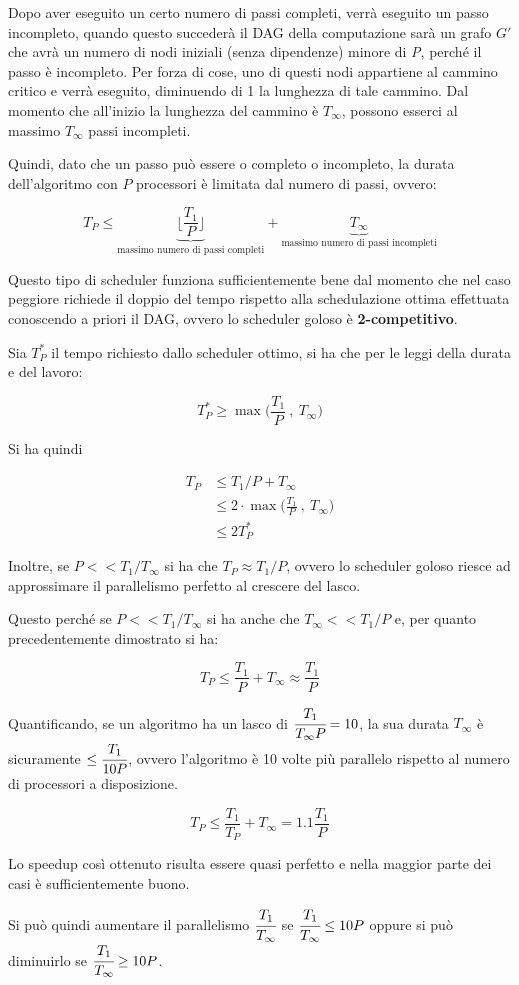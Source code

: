 Dopo aver eseguito un certo numero di passi completi, verrà eseguito un passo incompleto, quando questo succederà il DAG della computazione sarà un grafo $G'$ che avrà un numero di nodi iniziali (senza dipendenze) minore di \emph{P}, perché il passo è incompleto. 
Per forza di cose, uno di questi nodi appartiene al cammino critico e verrà eseguito, diminuendo di 1 la lunghezza di tale cammino. 
Dal momento che all'inizio la lunghezza del cammino è $T_\infty$, possono esserci al massimo
$T_\infty$ passi incompleti.

Quindi, dato che un passo può essere o completo o incompleto, la durata dell'algoritmo con $ P $ processori è limitata dal numero di passi, ovvero:

$$
T_P \leq \underbrace{\bigg\lfloor \frac{T_1}{P}\bigg\rfloor}_{\text{massimo numero di passi completi}} + \underbrace{T_\infty}_{\text{massimo numero di passi incompleti}}
$$

Questo tipo di scheduler funziona sufficientemente bene dal momento che nel caso peggiore richiede il doppio del tempo rispetto alla schedulazione ottima effettuata conoscendo a priori il DAG, ovvero lo scheduler goloso è \textbf{2-competitivo}.

Sia $T_{P}^*$ il tempo richiesto dallo scheduler ottimo, si ha che per le leggi della durata e del lavoro:

$$T_{P}^* \geq \max \bigg( \frac{T_1}{P} \: , \: T_\infty \bigg)$$

Si ha quindi 

\begin{align*}
T_{P} &\leq T_1/P + T_\infty \\
		 &\leq 2 \cdot \max \bigg( \frac{T_1}{P} \: , \: T_\infty \bigg) \\
		 &\leq 2T_{P}^*
\end{align*}

Inoltre, se $ P << T_1 / T_\infty $ si ha che $ T_P \approx T_1/P$, ovvero lo scheduler goloso riesce ad approssimare il parallelismo perfetto al crescere del lasco.

Questo perché se $ P << T_1 / T_\infty $ si ha anche che $T_\infty << T_1 / P$ e, per quanto precedentemente dimostrato si ha:

$$
T_P \leq \frac{T_1}{P} + T_\infty \approx \frac{T_1}{P}
$$

Quantificando, se un algoritmo ha un lasco di $\cfrac{T_1}{T_\infty P} = 10$, la sua durata $ T_\infty $ è sicuramente $\leq \cfrac{T_1}{10 P}$, ovvero l'algoritmo è 10 volte più parallelo rispetto al numero di processori a disposizione.

$$
T_P \leq \frac{T_1}{T_P} + T_\infty = 1.1 \frac{T_1}{P}
$$

Lo speedup così ottenuto risulta essere quasi perfetto e nella maggior parte dei casi è sufficientemente buono.

Si può quindi aumentare il parallelismo $\cfrac{T_1}{T_\infty}$ se $\cfrac{T_1}{T_\infty} \leq 10 P$  oppure si può diminuirlo se $\cfrac{T_1}{T_\infty} \geq 10 P$.
